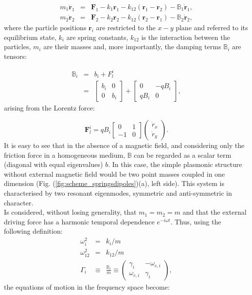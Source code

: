 \begin{eqnarray}
m_{1}\ddot{\mathbf{r}}_{1} & = & \mathbf{F}_{1}-k_{1}\mathbf{r}_{1}-k_{12}\left(\mathbf{r}_{1}-\mathbf{r}_{2}\right)-\mathbb{B}_{1}\dot{\mathbf{r}}_{1}, \nonumber \\
m_{2}\ddot{\mathbf{r}}_{2} & = & \mathbf{F}_{2}-k_{2}\mathbf{r}_{2}-k_{12}\left(\mathbf{r}_{2}-\mathbf{r}_{1}\right)-\mathbb{B}_{2}\dot{\mathbf{r}}_{2},
\end{eqnarray}
where the particle positions $\mathbf{r}_{i}$ are restricted to the $x-y$ plane and referred to its equilibrium
state, $k_{i}$ are spring constants, $k_{12}$ is the interaction between the particles, $m_{i}$ are their masses and, more importantly, the damping terms $\mathbb{B}_{i}$ are tensors:

\begin{eqnarray}
\mathbb{B}_{i} & = & b_{i}+F_{l}^{i}\\
 & = & \left[\begin{array}{cc}
b_{i} & 0\\
0 & b_{i}
\end{array}\right]+\left[\begin{array}{cc}
0 & -qB_{i}\\
qB_{i} & 0
\end{array}\right],
\end{eqnarray}
arising from the Lorentz force:

\begin{equation}
\mathbf{F}_{l}^{i} = qB_{i}\left[\begin{array}{cc}
0 & 1\\
-1 & 0
\end{array}\right]\left(\begin{array}{c}
\dot{r}_{x}\\
\dot{r}_{y}
\end{array}\right).
\end{equation}
It is easy to see that in the absence of a magnetic field, and considering only the friction force in a homogeneous medium, $\mathbb{B}$ can be regarded as a scalar term (diagonal with equal eigenvalues) $b$. In this case, the simple plasmonic structure without external magnetic field would be two point masses coupled in one dimension (Fig. (\ref{fig:scheme_springsdipoles})(a), left side). This system is characterised by two resonant eigenmodes, symmetric and anti-symmetric in character.\\
Is considered, without losing generality, that $m_{1} = m_{2} = m$ and that the external driving force has a harmonic temporal dependence $e^{-i\omega t}$. Thus, using the following definition:
\begin{eqnarray}
\omega_{i}^2 & = & {k_{i}}/{m} \nonumber \\
\omega_{12}^2 & = & {k_{12}}/{m}\nonumber \\
\Gamma_{i} & \equiv & \frac{\mathbb{B}_{i}}{m}\equiv \left(\begin{array}{cc}
\gamma_i & -\omega_{c,i}\\
\omega_{c,i} & \gamma_{i}
\end{array}\right),
\end{eqnarray}
the equations of motion in the frequency space become:

